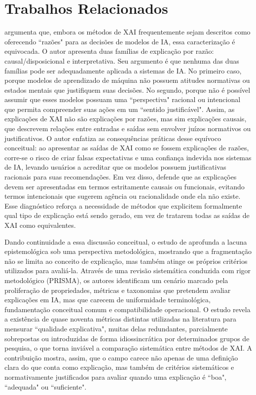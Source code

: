 \section{Trabalhos Relacionados}\label{sec:relacionados}

\cite{Graff2025} argumenta que, embora os métodos de XAI frequentemente sejam descritos como oferecendo ``razões" para as decisões de modelos de IA, essa caracterização é equivocada. O autor apresenta duas famílias de explicação por razão: causal/disposicional e interpretativa. Seu argumento é que nenhuma das duas famílias pode ser adequadamente aplicada a sistemas de IA. No primeiro caso, porque modelos de aprendizado de máquina não possuem atitudes normativas ou estados mentais que justifiquem suas decisões. No segundo, porque não é possível assumir que esses modelos possuam uma ``perspectiva" racional ou intencional que permita compreender suas ações em um ``sentido justificável". Assim, as explicações de XAI não são explicações por razões, mas sim explicações causais, que descrevem relações entre entradas e saídas sem envolver juízos normativos ou justificativos. O autor enfatiza as consequências práticas desse equívoco conceitual: ao apresentar as saídas de XAI como se fossem explicações de razões, corre-se o risco de criar falsas expectativas e uma confiança indevida nos sistemas de IA, levando usuários a acreditar que os modelos possuem justificativas racionais para suas recomendações. Em vez disso, defende que as explicações devem ser apresentadas em termos estritamente causais ou funcionais, evitando termos intencionais que sugerem agência ou racionalidade onde ela não existe. Esse diagnóstico reforça a necessidade de métodos que explicitem formalmente qual tipo de explicação está sendo gerado, em vez de tratarem todas as saídas de XAI como equivalentes.

Dando continuidade a essa discussão conceitual, o estudo de \cite{Pawlicki2024} aprofunda a lacuna epistemológica sob uma perspectiva metodológica, mostrando que a fragmentação não se limita ao conceito de explicação, mas também atinge os próprios critérios utilizados para avaliá-la. Através de uma revisão sistemática conduzida com rigor metodológico (PRISMA), os autores identificam um cenário marcado pela proliferação de propriedades, métricas e taxonomias que pretendem avaliar explicações em IA, mas que carecem de uniformidade terminológica, fundamentação conceitual comum e compatibilidade operacional. O estudo revela a existência de quase noventa métricas distintas utilizadas na literatura para mensurar ``qualidade explicativa", muitas delas redundantes, parcialmente sobrepostas ou introduzidas de forma idiossincrática por determinados grupos de pesquisa, o que torna inviável a comparação sistemática entre métodos de XAI. A contribuição mostra, assim, que o campo carece não apenas de uma definição clara do que conta como explicação, mas também de critérios sistemáticos e normativamente justificados para avaliar quando uma explicação é ``boa", ``adequada" ou ``suficiente".

